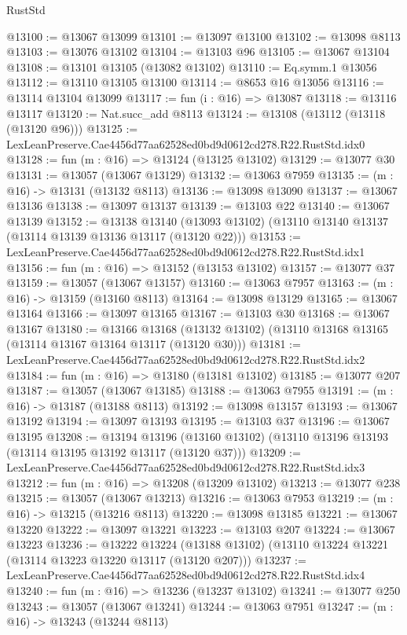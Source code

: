 \begin{lexlean}{RustStd}
\begin{coremodule}
@13100 := @13067 @13099
@13101 := @13097 @13100
@13102 := @13098 @8113
@13103 := @13076 @13102
@13104 := @13103 @96
@13105 := @13067 @13104
@13108 := @13101 @13105 (@13082 @13102)
@13110 := Eq.symm.{1} @13056
@13112 := @13110 @13105 @13100
@13114 := @8653 @16 @13056
@13116 := @13114 @13104 @13099
@13117 := fun (i : @16) => @13087
@13118 := @13116 @13117
@13120 := Nat.succ_add @8113
@13124 := @13108 (@13112 (@13118 (@13120 @96)))
@13125 := LexLeanPreserve.Cae4456d77aa62528ed0bd9d0612cd278.R22.RustStd.idx0
@13128 := fun (m : @16) => @13124 (@13125 @13102)
@13129 := @13077 @30
@13131 := @13057 (@13067 @13129)
@13132 := @13063 @7959
@13135 := (m : @16) -> @13131 (@13132 @8113)
@13136 := @13098 @13090
@13137 := @13067 @13136
@13138 := @13097 @13137
@13139 := @13103 @22
@13140 := @13067 @13139
@13152 := @13138
    @13140
    (@13093 @13102)
    (@13110 @13140 @13137 (@13114 @13139 @13136 @13117 (@13120 @22)))
@13153 := LexLeanPreserve.Cae4456d77aa62528ed0bd9d0612cd278.R22.RustStd.idx1
@13156 := fun (m : @16) => @13152 (@13153 @13102)
@13157 := @13077 @37
@13159 := @13057 (@13067 @13157)
@13160 := @13063 @7957
@13163 := (m : @16) -> @13159 (@13160 @8113)
@13164 := @13098 @13129
@13165 := @13067 @13164
@13166 := @13097 @13165
@13167 := @13103 @30
@13168 := @13067 @13167
@13180 := @13166
    @13168
    (@13132 @13102)
    (@13110 @13168 @13165 (@13114 @13167 @13164 @13117 (@13120 @30)))
@13181 := LexLeanPreserve.Cae4456d77aa62528ed0bd9d0612cd278.R22.RustStd.idx2
@13184 := fun (m : @16) => @13180 (@13181 @13102)
@13185 := @13077 @207
@13187 := @13057 (@13067 @13185)
@13188 := @13063 @7955
@13191 := (m : @16) -> @13187 (@13188 @8113)
@13192 := @13098 @13157
@13193 := @13067 @13192
@13194 := @13097 @13193
@13195 := @13103 @37
@13196 := @13067 @13195
@13208 := @13194
    @13196
    (@13160 @13102)
    (@13110 @13196 @13193 (@13114 @13195 @13192 @13117 (@13120 @37)))
@13209 := LexLeanPreserve.Cae4456d77aa62528ed0bd9d0612cd278.R22.RustStd.idx3
@13212 := fun (m : @16) => @13208 (@13209 @13102)
@13213 := @13077 @238
@13215 := @13057 (@13067 @13213)
@13216 := @13063 @7953
@13219 := (m : @16) -> @13215 (@13216 @8113)
@13220 := @13098 @13185
@13221 := @13067 @13220
@13222 := @13097 @13221
@13223 := @13103 @207
@13224 := @13067 @13223
@13236 := @13222
    @13224
    (@13188 @13102)
    (@13110 @13224 @13221 (@13114 @13223 @13220 @13117 (@13120 @207)))
@13237 := LexLeanPreserve.Cae4456d77aa62528ed0bd9d0612cd278.R22.RustStd.idx4
@13240 := fun (m : @16) => @13236 (@13237 @13102)
@13241 := @13077 @250
@13243 := @13057 (@13067 @13241)
@13244 := @13063 @7951
@13247 := (m : @16) -> @13243 (@13244 @8113)

\end{coremodule}
\end{lexlean}
